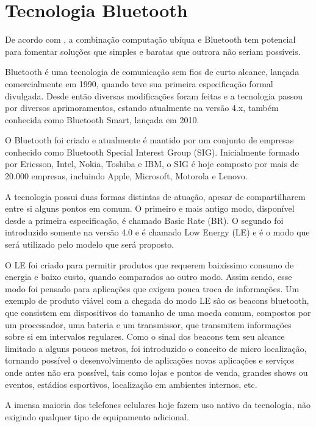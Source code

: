 \documentclass[english,brazilian]{UNISINOSmonografia}
\begin{document}
	\section{Tecnologia Bluetooth}

De acordo com , a combinação computação ubíqua e Bluetooth tem potencial para fomentar soluções que simples e baratas que outrora não seriam possíveis.

Bluetooth é uma tecnologia de comunicação sem fios de curto alcance, lançada comercialmente em 1990, quando teve sua primeira especificação formal divulgada. Desde então diversas modificações foram feitas e a tecnologia passou por diversos aprimoramentos, estando atualmente na versão 4.x, também conhecida como Bluetooth Smart, lançada em 2010. 

O Bluetooth foi criado e atualmente é mantido por um conjunto de empresas conhecido como Bluetooth Special Interest Group (SIG). Inicialmente formado por Ericsson, Intel, Nokia, Toshiba e IBM, o SIG é hoje composto por mais de 20.000 empresas, incluindo Apple, Microsoft, Motorola e Lenovo.

A tecnologia possui duas formas distintas de atuação, apesar de compartilharem entre si alguns pontos em comum. O primeiro e mais antigo modo, disponível desde a primeira especificação, é chamado Basic Rate (BR). O segundo foi introduzido somente na versão 4.0 e é chamado Low Energy (LE) e é o modo que será utilizado pelo modelo que será proposto.

O LE foi criado para permitir produtos que requerem baixíssimo consumo de energia e baixo custo, quando comparados ao outro modo. Assim sendo, esse modo foi pensado para aplicações que exigem pouca troca de informações. Um exemplo de produto viável com a chegada do modo LE são os beacons bluetooth, que consistem em dispositivos do tamanho de uma moeda comum, compostos por um processador, uma bateria e um transmissor, que transmitem informações sobre si em intervalos regulares. Como o sinal dos beacons tem seu alcance limitado a alguns poucos metros, foi introduzido o conceito de micro localização, tornando possível o desenvolvimento de aplicações novas aplicações e serviços onde antes não era possível, tais como lojas e pontos de venda, grandes shows ou eventos, estádios esportivos, localização em ambientes internos, etc.

A imensa maioria dos telefones celulares hoje fazem uso nativo da tecnologia, não exigindo qualquer tipo de equipamento adicional.
\end{document}
